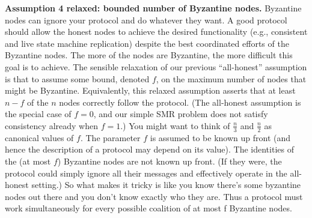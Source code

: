 \noindent
\textbf{Assumption 4 relaxed: bounded number of Byzantine nodes.} Byzantine nodes
can ignore your protocol and do whatever they want. A good protocol should allow the
honest nodes to achieve the desired functionality (e.g., consistent and live state machine
replication) despite the best coordinated efforts of the Byzantine nodes. The more of the
nodes are Byzantine, the more difficult this goal is to achieve. The sensible relaxation of our
previous “all-honest” assumption is that to assume some bound, denoted $f$, on the maximum
number of nodes that might be Byzantine. Equivalently, this relaxed assumption asserts that
at least $n−f$ of the $n$ nodes correctly follow the protocol. (The all-honest assumption is the
special case of $f = 0$, and our simple SMR problem does not satisfy consistency already when
$f = 1$.) You might want to think of $\frac{n}{3}$ and $\frac{n}{2}$ as canonical values of $f$. The parameter $f$
is assumed to be known up front (and hence the description of a protocol may depend on
its value). The identities of the (at most $f$) Byzantine nodes are not known up front. (If they were, the protocol could simply ignore all their messages and effectively operate in the all-honest setting.) So what makes it tricky is like you know there's some byzantine nodes out there and you don't
know exactly who they are.  Thus a protocol must work simultaneously for every possible coalition
of at most f Byzantine nodes.



